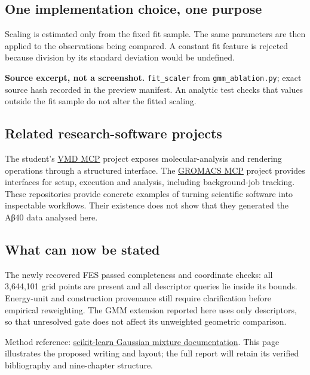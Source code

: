 \documentclass[a4paper,11pt,oneside,headings=normal]{scrreprt}
\begin{document}
\subsection*{One implementation choice, one purpose}
Scaling is estimated only from the fixed fit sample. The same parameters are then applied to the observations being compared. A constant fit feature is rejected because division by its standard deviation would be undefined.

{\small\textbf{Source excerpt, not a screenshot.} \texttt{fit\_scaler} from \texttt{gmm\_ablation.py}; exact source hash recorded in the preview manifest. An analytic test checks that values outside the fit sample do not alter the fitted scaling.\par}

\subsection*{Related research-software projects}
The student's \href{https://github.com/Alierkn/vmd-mcp}{VMD MCP} project exposes molecular-analysis and rendering operations through a structured interface. The \href{https://github.com/Alierkn/gromacs-mcp}{GROMACS MCP} project provides interfaces for setup, execution and analysis, including background-job tracking. These repositories provide concrete examples of turning scientific software into inspectable workflows. Their existence does not show that they generated the Aβ40 data analysed here.

\subsection*{What can now be stated}
The newly recovered FES passed completeness and coordinate checks: all 3,644,101 grid points are present and all descriptor queries lie inside its bounds. Energy-unit and construction provenance still require clarification before empirical reweighting. The GMM extension reported here uses only descriptors, so that unresolved gate does not affect its unweighted geometric comparison.

{\small Method reference: \href{https://scikit-learn.org/stable/modules/mixture.html}{scikit-learn Gaussian mixture documentation}. This page illustrates the proposed writing and layout; the full report will retain its verified bibliography and nine-chapter structure.}
\end{document}
